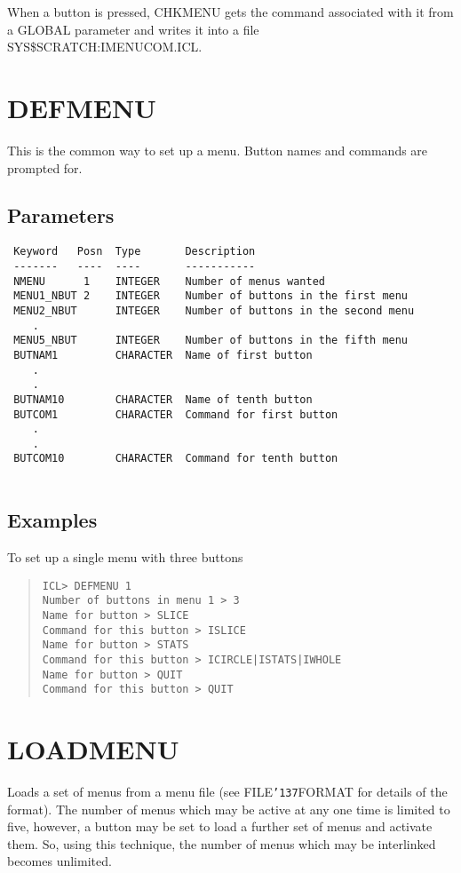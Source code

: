 \documentclass{book}
\renewcommand{\_}{{\tt\char'137}}     %
\begin{document}
When a button is pressed, CHKMENU gets the command associated with it
from a GLOBAL parameter and writes it into a file
SYS\$SCRATCH:IMENUCOM.ICL.
 
\section{DEFMENU}
This is the common way to set up a menu. Button names and commands
are prompted for.
 
\subsection{Parameters}
\begin{verbatim}
 Keyword   Posn  Type       Description
 -------   ----  ----       -----------
 NMENU      1    INTEGER    Number of menus wanted
 MENU1_NBUT 2    INTEGER    Number of buttons in the first menu
 MENU2_NBUT      INTEGER    Number of buttons in the second menu
    .
 MENU5_NBUT      INTEGER    Number of buttons in the fifth menu
 BUTNAM1         CHARACTER  Name of first button
    .
    .
 BUTNAM10        CHARACTER  Name of tenth button
 BUTCOM1         CHARACTER  Command for first button
    .
    .
 BUTCOM10        CHARACTER  Command for tenth button
 
\end{verbatim}\subsection{Examples}
To set up a single menu with three buttons
\begin{quote}\begin{verbatim}
ICL> DEFMENU 1
Number of buttons in menu 1 > 3
Name for button > SLICE
Command for this button > ISLICE
Name for button > STATS
Command for this button > ICIRCLE|ISTATS|IWHOLE
Name for button > QUIT
Command for this button > QUIT
\end{verbatim}\end{quote}
\section{LOADMENU}
Loads a set of menus from a menu file (see FILE\_FORMAT for details
of the format). The number of menus which may be active at any one
time is limited to five, however, a button may be set to load a
further set of menus and activate them. So, using this technique,
the number of menus which may be interlinked becomes unlimited.
 
\end{document}
